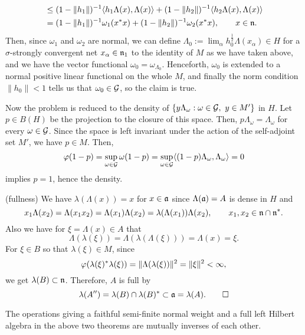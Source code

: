 \documentclass{../../small}
\begin{document}
\begin{pf}
\begin{align*}
&\le(1-\|h_1\|)^{-1}\langle h_1\Lambda(x),\Lambda(x)\rangle+(1-\|h_2\|)^{-1}\langle h_2\Lambda(x),\Lambda(x)\rangle\\
&=(1-\|h_1\|)^{-1}\omega_1(x^*x)+(1-\|h_2\|)^{-1}\omega_2(x^*x),\qquad x\in\mathfrak{n}.
\end{align*}
Then, since $\omega_1$ and $\omega_2$ are normal, we can define $\Lambda_0:=\lim_\alpha h_0^{\frac12}\Lambda(x_\alpha)\in H$ for a $\sigma$-strongly convergent net $x_\alpha\in\mathfrak{n}_1$ to the identity of $M$ as we have taken above, and we have the vector functional $\omega_0=\omega_{\Lambda_0}$.
Henceforth, $\omega_0$ is extended to a normal positive linear functional on the whole $M$, and finally the norm condition $\|h_0\|<1$ tells us that $\omega_0\in\mathcal{G}$, so the claim is true.

Now the problem is reduced to the density of $\{y\Lambda_{\omega}:\omega\in\mathcal{G},\ y\in M'\}$ in $H$.
Let $p\in B(H)$ be the projection to the closure of this space.
Then, $p\Lambda_\omega=\Lambda_\omega$ for every $\omega\in\mathcal{G}$.
Since the space is left invariant under the action of the self-adjoint set $M'$, we have $p\in M$.
Then,
\[\varphi(1-p)=\sup_{\omega\in\mathcal{G}}\omega(1-p)=\sup_{\omega\in\mathcal{G}}\langle(1-p)\Lambda_\omega,\Lambda_\omega\rangle=0\]
implies $p=1$, hence the density.

(fullness)
We have $\lambda(\Lambda(x))=x$ for $x\in\mathfrak{a}$ since $\Lambda(\mathfrak{a})=A$ is dense in $H$ and
\[x_1\Lambda(x_2)=\Lambda(x_1x_2)=\Lambda(x_1)\Lambda(x_2)=\lambda(\Lambda(x_1))\Lambda(x_2),\qquad x_1,x_2\in\mathfrak{n}\cap\mathfrak{n}^*.\]
Also we have for $\xi=\Lambda(x)\in A$ that
\[\Lambda(\lambda(\xi))=\Lambda(\lambda(\Lambda(\xi)))=\Lambda(x)=\xi.\]
For $\xi\in B$ so that $\lambda(\xi)\in M$, since
\[\varphi(\lambda(\xi)^*\lambda(\xi))=\|\Lambda(\lambda(\xi))\|^2=\|\xi\|^2<\infty,\]
we get $\lambda(B)\subset\mathfrak{n}$.
Therefore, $A$ is full by
\[\lambda(A'')=\lambda(B)\cap\lambda(B)^*\subset\mathfrak{a}=\lambda(A).\qedhere\]
\end{pf}

\begin{cor}
The operations giving a faithful semi-finite normal weight and a full left Hilbert algebra in the above two theorems are mutually inverses of each other.
\end{cor}
\end{document}
